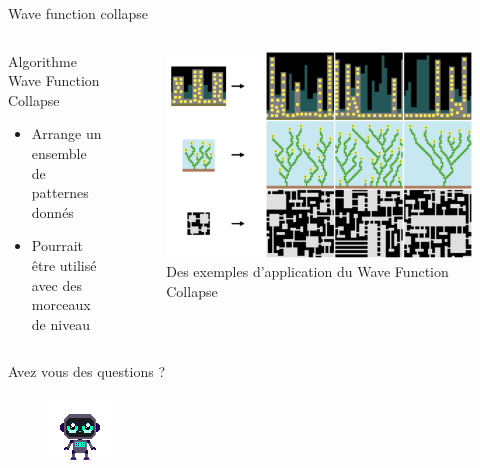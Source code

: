 \documentclass{beamer}
\begin{document}
{\begin{frame}{Wave function collapse}
    \begin{columns}
        \begin{block}{Algorithme Wave Function Collapse}
            \begin{itemize}
                \item[\bullet] Arrange un ensemble de patternes donnés
                \item[\bullet] Pourrait être utilisé avec des morceaux de niveau
            \end{itemize}
        \end{block}
        \begin{figure}
            \centering
            \includegraphics[width=1.0\textwidth]{wfc-examples}
            \caption{Des exemples d'application du Wave Function Collapse}
        \end{figure}
    \end{columns}
\end{frame}

}

\begin{frame}
    \centering
    Avez vous des questions ?
    \begin{figure}
        \centering
        \includegraphics[width=0.5\linewidth]{character_placeholder.png}
    \end{figure}
\end{frame}
\end{document}
